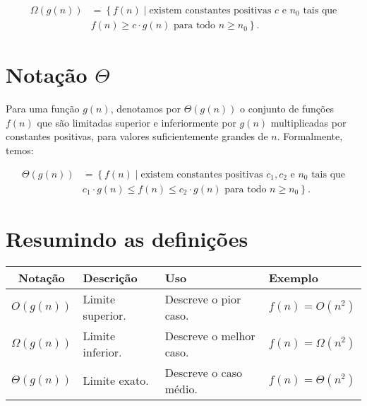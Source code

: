 \documentclass{article}
\begin{document}
\begin{align*}
\Omega(g(n)) &= \left\{ f(n) \mid \text{existem constantes positivas } c \text{ e } n_0 \text{ tais que} \right. \\
&\left. f(n) \geq c \cdot g(n) \text{ para todo } n \geq n_0 \right\}.
\end{align*}

\section{Notação \(\Theta\)}

Para uma função \( g(n) \), denotamos por \( \Theta(g(n)) \) o conjunto de funções \( f(n) \) que são limitadas superior e inferiormente por \( g(n) \) multiplicadas por constantes positivas, para valores suficientemente grandes de \( n \). Formalmente, temos:

\begin{align*}
\Theta(g(n)) &= \left\{ f(n) \mid \text{existem constantes positivas } c_1, c_2 \text{ e } n_0 \text{ tais que} \right. \\
&\left. c_1 \cdot g(n) \leq f(n) \leq c_2 \cdot g(n) \text{ para todo } n \geq n_0 \right\}.
\end{align*}

\section{Resumindo as definições}

\begin{table}[h!]
\centering
\begin{tabular}{|c|l|l|l|}
\hline
\textbf{Notação} & \textbf{Descrição} & \textbf{Uso} & \textbf{Exemplo} \\
\hline
\(O(g(n))\) & Limite superior. & Descreve o pior caso. & \(f(n) = O(n^2)\) \\
\hline
\(\Omega(g(n))\) & Limite inferior. & Descreve o melhor caso. & \(f(n) = \Omega(n^2)\) \\
\hline
\(\Theta(g(n))\) & Limite exato. & Descreve o caso médio. & \(f(n) = \Theta(n^2)\) \\
\hline
\end{tabular}
\end{table}
\end{document}
